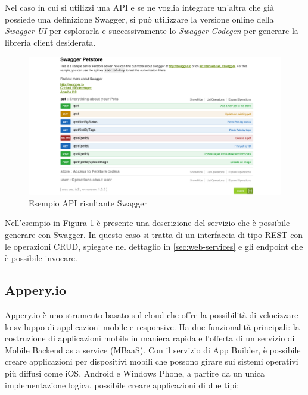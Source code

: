 Nel caso in cui si utilizzi una API e se ne voglia integrare un'altra che già possiede una definizione Swagger, si può utilizzare la versione online della \emph{Swagger UI} per esplorarla e successivamente lo \emph{Swagger Codegen} per generare la libreria client desiderata.

\begin{figure}[ht]
	\centering
	\includegraphics[width=\textwidth]{2-preliminari/Immagini/swagger-petstore.png}
	\caption{Esempio API risultante Swagger}\label{fig:swagger-petstore}
\end{figure}

Nell'esempio in Figura \ref{fig:swagger-petstore} è presente una descrizione del servizio che è possibile generare con Swagger. In questo caso si tratta di un interfaccia di tipo REST con le operazioni CRUD, spiegate nel dettaglio in \ref{sec:web-services} e gli endpoint che è possibile invocare.

\subsection*{Appery.io}

Appery.io è uno strumento basato sul cloud che offre la possibilità di velocizzare lo sviluppo di applicazioni mobile e responsive. Ha due funzionalità principali: la costruzione di applicazioni mobile in maniera rapida e l'offerta di un servizio di Mobile Backend as a service (MBaaS).
Con il servizio di App Builder, è possibile creare applicazioni per dispositivi mobili che possono girare sui sistemi operativi più diffusi come iOS, Android e Windows Phone, a partire da un unica implementazione logica.
\upe possibile creare applicazioni di due tipi:

